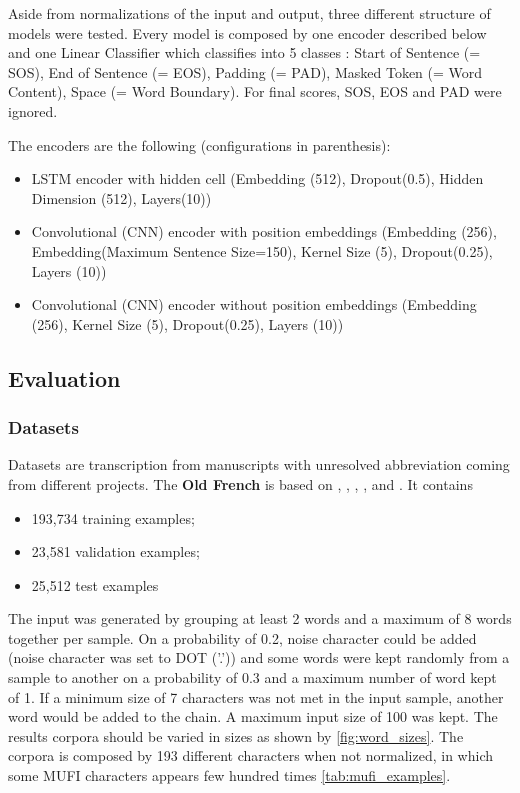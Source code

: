 \documentclass{jdmdh}
\begin{document}
Aside from normalizations of the input and output, three different structure of models were tested. Every model is composed by one encoder described below and one Linear Classifier which classifies into 5 classes : Start of Sentence (= SOS), End of Sentence (= EOS), Padding (= PAD), Masked Token (= Word Content), Space (= Word Boundary). For final scores, SOS, EOS and PAD were ignored.

The encoders are the following (configurations in parenthesis):

\begin{itemize}
  \item LSTM encoder with hidden cell (Embedding (512), Dropout(0.5), Hidden Dimension (512), Layers(10))
  \item Convolutional (CNN) encoder with position embeddings (Embedding (256), Embedding(Maximum Sentence Size=150), Kernel Size (5), Dropout(0.25), Layers (10))
  \item Convolutional (CNN) encoder without position embeddings (Embedding (256), Kernel Size (5), Dropout(0.25), Layers (10))
\end{itemize}

\subsection{Evaluation}

\subsubsection{Datasets}

Datasets are transcription from manuscripts with unresolved abbreviation coming from different projects. The \textbf{Old French} is based on \citet{8269990}, \citet{pinche:hal-01628533}, \citet{jean_baptiste_camps_2019_2630574}, \citet{bfmmss}, and \citet{tnah_transcription}. It contains

\begin{itemize}
    \item 193,734 training examples;
    \item 23,581 validation examples;
    \item 25,512 test examples
\end{itemize}

The input was generated by grouping at least 2 words and a maximum of 8 words together per sample. On a probability of 0.2, noise character could be added (noise character was set to DOT ('.')) and some words were kept randomly from a sample to another on a probability of 0.3 and a maximum number of word kept of 1. If a minimum size of 7 characters was not met in the input sample, another word would be added to the chain. A maximum input size of 100 was kept. The results corpora should be varied in sizes as shown by \ref{fig:word_sizes}. The corpora is composed by 193 different characters when not normalized, in which some MUFI characters appears few hundred times \ref{tab:mufi_examples}.
\end{document}
